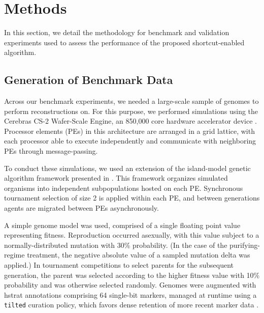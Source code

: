 \section{Methods} \label{sec:methods}

In this section, we detail the methodology for benchmark and validation experiments used to assess the performance of the proposed shortcut-enabled algorithm.

\subsection{Generation of Benchmark Data}

Across our benchmark experiments, we needed a large-scale sample of genomes to perform reconstructions on.
For this purpose, we performed simulations using the Cerebras CS-2
Wafer-Scale Engine, an 850,000 core hardware accelerator device \citep{lie2023cerebras}.
Processor elements (PEs) in this architecture are arranged in a grid lattice, with each processor able to execute independently and communicate with neighboring PEs through message-passing.

To conduct these simulations, we used an extension of the island-model genetic algorithm framework presented in \citep{moreno2024trackable}.
This framework organizes simulated organisms into independent subpopulations hosted on each PE.
Synchronous tournament selection of size 2 is applied within each PE, and between generations agents are migrated between PEs asynchronously.


A simple genome model was used, comprised of a single floating point value representing fitness.
Reproduction occurred asexually, with this value subject to a normally-distributed mutation with 30\% probability.
(In the case of the purifying-regime treatment, the negative absolute value of a sampled mutation delta was applied.)
In tournament competitions to select parents for the subsequent generation, the parent was selected according to the higher fitness value with 10\% probability and was otherwise selected randomly.
Genomes were augmented with hstrat annotations comprising 64 single-bit markers, managed at runtime using a \texttt{tilted} curation policy, which favors dense retention of more recent marker data \citep{moreno2024structured}.

